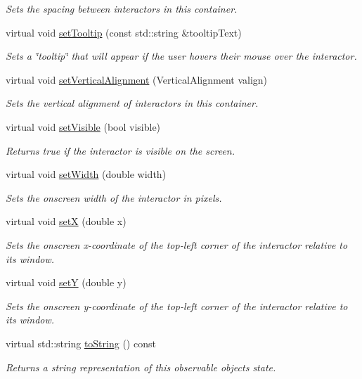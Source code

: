 \begin{DoxyCompactItemize}
\begin{DoxyCompactList}\small\item\em Sets the spacing between interactors in this container. \end{DoxyCompactList}\item 
virtual void \mbox{\hyperlink{classGInteractor_a039e0e49beaecc275efce02d416acea8}{set\+Tooltip}} (const std\+::string \&tooltip\+Text)
\begin{DoxyCompactList}\small\item\em Sets a \char`\"{}tooltip\char`\"{} that will appear if the user hovers their mouse over the interactor. \end{DoxyCompactList}\item 
virtual void \mbox{\hyperlink{classGContainer_a465537d012ad40704a011ad927ce435d}{set\+Vertical\+Alignment}} (Vertical\+Alignment valign)
\begin{DoxyCompactList}\small\item\em Sets the vertical alignment of interactors in this container. \end{DoxyCompactList}\item 
virtual void \mbox{\hyperlink{classGInteractor_a18e44e30b31525a243960ca3928125aa}{set\+Visible}} (bool visible)
\begin{DoxyCompactList}\small\item\em Returns true if the interactor is visible on the screen. \end{DoxyCompactList}\item 
virtual void \mbox{\hyperlink{classGInteractor_aa3f3fba4cb131baa8696ba01e3bceca1}{set\+Width}} (double width)
\begin{DoxyCompactList}\small\item\em Sets the onscreen width of the interactor in pixels. \end{DoxyCompactList}\item 
virtual void \mbox{\hyperlink{classGInteractor_a9c18fcc579333bf9653d13ad2b372e39}{setX}} (double x)
\begin{DoxyCompactList}\small\item\em Sets the onscreen x-\/coordinate of the top-\/left corner of the interactor relative to its window. \end{DoxyCompactList}\item 
virtual void \mbox{\hyperlink{classGInteractor_a7d57e2a5c35d27feb58fd498a3cf82b9}{setY}} (double y)
\begin{DoxyCompactList}\small\item\em Sets the onscreen y-\/coordinate of the top-\/left corner of the interactor relative to its window. \end{DoxyCompactList}\item 
virtual std\+::string \mbox{\hyperlink{classGObservable_a1fe5121d6528fdea3f243321b3fa3a49}{to\+String}} () const
\begin{DoxyCompactList}\small\item\em Returns a string representation of this observable object\textquotesingle{}s state. \end{DoxyCompactList}\end{DoxyCompactItemize}
